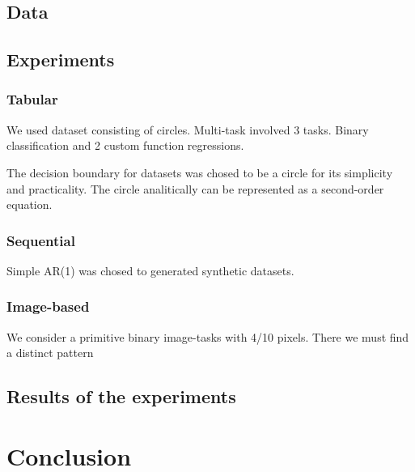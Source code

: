 \documentclass{article}
\begin{document}
    \subsection{Data}
  
    \subsection{Experiments}
    \subsubsection{Tabular}
        We used dataset consisting of circles. Multi-task involved 3 tasks. Binary classification and 2 custom function regressions. 
        
        The decision boundary for datasets was chosed to be a circle for its simplicity and practicality. The circle analitically can be represented as a second-order equation. 
    \subsubsection{Sequential}
        
        Simple AR(1) was chosed to generated synthetic datasets. 

    \subsubsection{Image-based}
        We consider a primitive binary image-tasks with 4/10 pixels. There we must find a distinct pattern

    \subsection{Results of the experiments}

\section{Conclusion}



\end{document}
